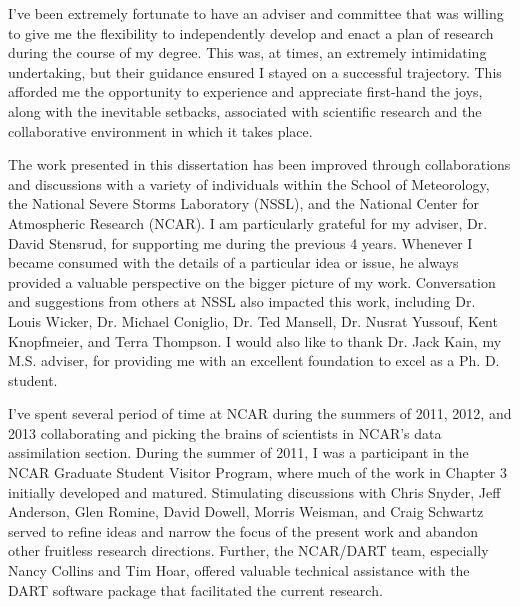 \begin{preface}
I've been extremely fortunate to have an adviser and committee that was willing to give me the flexibility to independently develop and enact a plan of research during the course of my degree. This was, at times, an extremely intimidating undertaking, but their guidance ensured I stayed on a successful trajectory. This afforded me the opportunity to experience and appreciate first-hand the joys, along with the inevitable setbacks, associated with scientific research and the collaborative environment in which it takes place.

The work presented in this dissertation has been improved through  collaborations and discussions with a variety of individuals within the School of Meteorology, the National Severe Storms Laboratory (NSSL), and the National Center for Atmospheric Research (NCAR). I am particularly grateful for my adviser, Dr. David Stensrud, for supporting me during the previous 4 years. Whenever I became consumed with the details of a particular idea or issue, he always provided a valuable perspective on the bigger picture of my work. Conversation and suggestions from others at NSSL also impacted this work, including Dr. Louis Wicker, Dr. Michael Coniglio, Dr. Ted Mansell, Dr. Nusrat Yussouf, Kent Knopfmeier, and Terra Thompson. I would also like to thank Dr. Jack Kain, my M.S. adviser, for providing me with an excellent foundation to excel as a Ph. D. student.

I've spent several period of time at NCAR during the summers of 2011, 2012, and 2013 collaborating and picking the brains of scientists in NCAR's data assimilation section. During the summer of 2011, I was a participant in the NCAR Graduate Student Visitor Program, where much of the work in Chapter 3 initially developed and matured. Stimulating discussions with Chris Snyder, Jeff Anderson, Glen Romine, David Dowell, Morris Weisman, and Craig Schwartz served to refine ideas and narrow the focus of the present work and abandon other fruitless research directions. Further, the NCAR/DART team, especially Nancy Collins and Tim Hoar, offered valuable technical assistance with the DART software package that facilitated the current research.



\end{preface}
